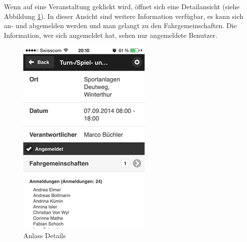 Wenn auf eine Veranstaltung geklickt wird, öffnet sich eine Detailansicht (siehe Abbildung \ref{fig:app_detail_event}). In dieser Ansicht sind weitere Information verfügbar, es kann sich an- und abgemelden werden und man gelangt zu den Fahrgemeinschaften. Die Information, wer sich angemeldet hat, sehen nur angemeldete Benutzer.

\begin{figure}[h]
\centering
\includegraphics[scale=0.5]{images/app/event_detail.png}
\caption{Anlass Details}
\label{fig:app_detail_event}
\end{figure}

\newpage
\FloatBarrier
